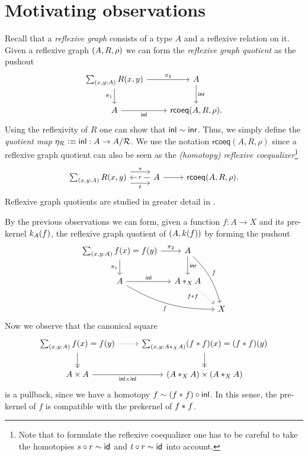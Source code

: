\section{Motivating observations}
Recall that a \emph{reflexive graph} consists of a type $A$ and a reflexive relation on it. Given a reflexive graph ${\mathopen{}(A,R,\rho)\mathclose{}}$ we can form the \emph{reflexive graph quotient} as the pushout
\begin{equation*}
\begin{tikzcd}
\sm{x,y:A}R(x,y) \arrow[r,"\pi_2"] \arrow[d,swap,"\pi_1"] & A \arrow[d,"\inr"] \\
A \arrow[r,swap,"\inl"] & \mathsf{rcoeq}(A,R,\rho).
\end{tikzcd}
\end{equation*}
Using the reflexivity of $R$ one can show that ${\mathsf{inl}}\sim {\mathsf{inr}}$. Thus, we simply define the \emph{quotient map} $\eta_{\mathcal{R}}\vcentcolon\equiv {\mathsf{inl}} : A\to A/\mathcal{R}$. We use the notation $\mathsf{rcoeq}(A,R,\rho)$ since a reflexive graph quotient can also be seen as the \emph{(homotopy) reflexive coequalizer}\footnote{Note that to formulate the reflexive coequalizer one has to be careful to take the homotopies $s\circ r\sim \mathsf{id}_{}$ and $t\circ r\sim \mathsf{id}_{}$ into account.}
\begin{equation*}
\begin{tikzcd}
\sm{x,y:A}R(x,y) \arrow[r,yshift=.7em,"s"] \arrow[r,yshift=-.7em,swap,"t"] & A \arrow[l,"r" description] \arrow[r] & \mathsf{rcoeq}(A,R,\rho).
\end{tikzcd}
\end{equation*}
Reflexive graph quotients are studied in greater detail in \cite{graphquotients}.

By the previous observations we can form, given a function $f : A \to X$ and its pre-kernel $k_A(f)$, the reflexive graph quotient of ${\mathopen{}(A,k(f))\mathclose{}}$ by forming the pushout
\begin{equation*}
\begin{tikzcd}[column sep=small]
\sm{x,y:A} f(x)=f(y) \arrow[r,"\pi_2"] \arrow[d,swap,"\pi_1"] & A \arrow[d,"\inr"] \arrow[ddr,bend left=15,"f"] \\
A \arrow[r,"\inl"] \arrow[drr,bend right=15,swap,"f"] & A \ast_X A \arrow[dr,densely dotted,swap,"f\ast f" near start] \\
& & X
\end{tikzcd}
\end{equation*}
Now we observe that the canonical square
\begin{equation*}
\begin{tikzcd}
\sm{x,y:A}f(x)=f(y) \arrow[d,->>] \arrow[r,densely dotted] & \sm{x,y:A \ast_X A} (f\ast f)(x)=(f\ast f)(y) \arrow[d,->>] \\
A\times A \arrow[r,swap,"\inl\times\inl"] & (A\ast_X A)\times (A\ast_X A)
\end{tikzcd}
\end{equation*}
is a pullback, since we have a homotopy $f\sim ({f}\ast_{}{f})\circ{\mathsf{inl}}$. 
In this sense, the pre-kernel of $f$ is compatible with the prekernel of ${f}\ast_{}{f}$.

